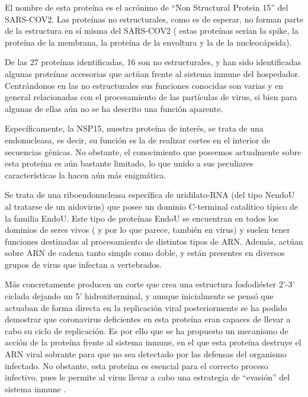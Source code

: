 \documentclass[12pt]{article}
\begin{document}
El nombre de esta proteína es el acrónimo de “Non Structural Protein 15” del SARS-COV2. Las proteínas no estructurales, como es de esperar, no forman parte de la estructura en sí misma del SARS-COV2 ( estas proteínas serían la spike, la proteína de la membrana, la proteína de la envoltura y la de la nucleocápsida). 
\newline

De las 27 proteínas identificadas, 16 son no estructurales, y han sido identificadas algunas proteínas accesorias que actúan frente al sistema inmune del hospedador. Centrándonos en las no estructurales sus funciones conocidas son varias y en general relacionadas con el procesamiento de las partículas de virus, si bien para algunas de ellas aún no se ha descrito una función aparente.
\newline

Específicamente, la NSP15, nuestra proteína de interés, se trata de una endonucleasa, es decir, su función es la de realizar cortes en el interior de secuencias génicas. No obstante, el conocimiento que poseemos actualmente sobre esta proteína es aún bastante limitado, lo que unido a sus peculiares características la hacen aún más enigmática.
\newline

Se trata de una riboendonucleasa específica de uridilato-RNA  (del tipo NendoU al tratarse de un nidovirus) que posee un dominio C-terminal catalítico típico de la familia EndoU. Este tipo de proteínas EndoU se encuentran en todos los dominios de seres vivos ( y por lo que parece, también en virus) y suelen tener funciones destinadas al procesamiento de distintos tipos de ARN. Además, actúan sobre ARN de cadena tanto simple como doble, y están presentes en diversos grupos de virus que infectan a vertebrados. 
\newline

Más concretamente producen un corte que crea una estructura fosfodiéster 2’-3’ ciclada dejando un 5’ hidroxiterminal, y aunque inicialmente se pensó que actuaban de forma directa en la replicación viral posteriormente se ha podido demostrar que coronavirus deficientes en esta proteína eran capaces de llevar a cabo su ciclo de replicación. Es por ello que se ha propuesto un mecanismo de acción de la proteína frente al sistema inmune, en el que esta proteína destruye el ARN viral sobrante para que no sea detectado por las defensas del organismo infectado. No obstante, esta proteína es esencial para el correcto proceso infectivo, pues le permite al virus llevar a cabo una estrategia de ``evasión'' del sistema inmune \cite{Kim20201596}.
\newline
\end{document}
